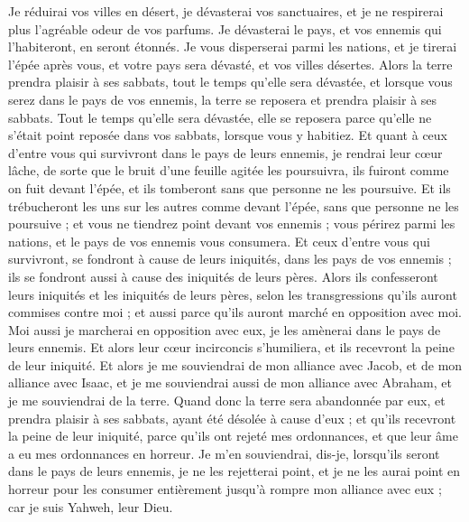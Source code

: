 \begin{multicols}{2}
Je réduirai vos villes en désert, je dévasterai vos sanctuaires, et je ne respirerai plus l'agréable odeur de vos parfums.
Je dévasterai le pays, et vos ennemis qui l'habiteront, en seront étonnés.
Je vous disperserai parmi les nations, et je tirerai l'épée après vous, et votre pays sera dévasté, et vos villes désertes.
Alors la terre prendra plaisir à ses sabbats, tout le temps qu'elle sera dévastée, et lorsque vous serez dans le pays de vos ennemis, la terre se reposera et prendra plaisir à ses sabbats.
Tout le temps qu'elle sera dévastée, elle se reposera parce qu'elle ne s'était point reposée dans vos sabbats, lorsque vous y habitiez.
Et quant à ceux d'entre vous qui survivront dans le pays de leurs ennemis, je rendrai leur cœur lâche, de sorte que le bruit d'une feuille agitée les poursuivra, ils fuiront comme on fuit devant l'épée, et ils tomberont sans que personne ne les poursuive.
Et ils trébucheront les uns sur les autres comme devant l'épée, sans que personne ne les poursuive ; et vous ne tiendrez point devant vos ennemis ;
vous périrez parmi les nations, et le pays de vos ennemis vous consumera.
Et ceux d'entre vous qui survivront, se fondront à cause de leurs iniquités, dans les pays de vos ennemis ; ils se fondront aussi à cause des iniquités de leurs pères.
Alors ils confesseront leurs iniquités et les iniquités de leurs pères, selon les transgressions qu'ils auront commises contre moi ; et aussi parce qu'ils auront marché en opposition avec moi.
Moi aussi je marcherai en opposition avec eux, je les amènerai dans le pays de leurs ennemis. Et alors leur cœur incirconcis s'humiliera, et ils recevront la peine de leur iniquité.
Et alors je me souviendrai de mon alliance avec Jacob, et de mon alliance avec Isaac, et je me souviendrai aussi de mon alliance avec Abraham, et je me souviendrai de la terre.
Quand donc la terre sera abandonnée par eux, et prendra plaisir à ses sabbats, ayant été désolée à cause d'eux ; et qu'ils recevront la peine de leur iniquité, parce qu'ils ont rejeté mes ordonnances, et que leur âme a eu mes ordonnances en horreur.
Je m'en souviendrai, dis-je, lorsqu'ils seront dans le pays de leurs ennemis, je ne les rejetterai point, et je ne les aurai point en horreur pour les consumer entièrement jusqu'à rompre mon alliance avec eux ; car je suis Yahweh, leur Dieu.

\end{multicols}
